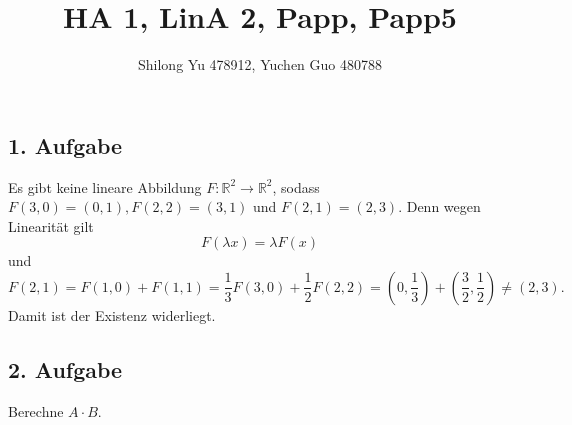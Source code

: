 \documentclass[fleqn,draft,a5paper]{article}
\title{HA 1, LinA 2, Papp, Papp5}
\author{Shilong Yu 478912, Yuchen Guo 480788}
\theoremstyle{remark}
\begin{document}
\maketitle
\newpage
\subsection{1. Aufgabe}
Es gibt keine lineare Abbildung \(F\colon \mathbb{R}^{2} \to \mathbb{R}^{2}\), sodass
\(F(3,0)=(0,1), F(2,2)=(3,1) \) und \(F(2,1)=(2,3)\).  Denn wegen Linearität
gilt
\[F(\lambda x) = \lambda F(x)\]
und
\[F(2,1)=F(1,0)+F(1,1) = \frac{1}{3}F(3,0) + \frac{1}{2}F(2,2) =
  (0,\frac{1}{3})+(\frac{3}{2}, \frac{1}{2}) \ne (2,3).\]
Damit ist der Existenz widerliegt.
\subsection{2. Aufgabe}
Berechne \(A \cdot B\).
\end{document}
